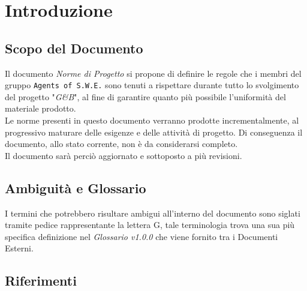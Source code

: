 \section{Introduzione}\label{Intro}

\subsection{Scopo del Documento}
Il documento \textit{Norme di Progetto} si propone di definire le regole che i membri del gruppo \texttt{Agents of S.W.E.} sono tenuti a rispettare durante tutto lo svolgimento del progetto "\textit{G\&B}", al fine di garantire quanto più possibile l'uniformità del materiale prodotto.\\
Le norme presenti in questo documento verranno prodotte incrementalmente, al progressivo maturare delle esigenze e delle attività di progetto. Di conseguenza il documento, allo stato corrente, non è da considerarsi completo.\\
Il documento sarà perciò aggiornato e sottoposto a più revisioni.

\subsection{Ambiguità e Glossario}
I termini che potrebbero risultare ambigui all'interno del documento sono siglati tramite pedice rappresentante la lettera \textmd{G}, tale terminologia trova una sua più specifica definizione nel \textit{Glossario v1.0.0} che viene fornito tra i Documenti Esterni.

\subsection{Riferimenti}
